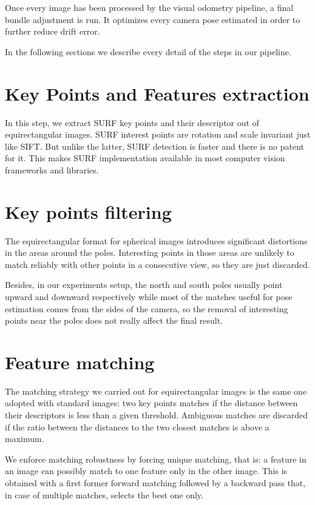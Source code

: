 Once every image has been processed by the visual odometry pipeline, a final 
bundle adjustment is run. It optimizes every camera pose estimated in order to 
further reduce drift error.

In the following sections we describe every detail of the steps in our pipeline.

\section{Key Points and Features extraction}
In this step, we extract SURF key points and their descriptor out of 
equirectangular images. SURF 
interest points are rotation and scale invariant just like SIFT. But unlike 
the latter, SURF detection is faster and there is no patent for it. 
This makes SURF implementation available in most computer vision frameworks and 
libraries.

\section{Key points filtering}
The equirectangular format for spherical images introduces significant 
distortions in the areas around the poles. Interesting points in those areas 
are unlikely to match reliably with other points in a consecutive view, 
so they are just discarded.

Besides, in our experiments setup, the north and south poles usually point 
upward and downward respectively while most of the matches useful for pose 
estimation comes from the sides of the camera, so the removal of interesting 
points near the poles does not really affect the final result.

\section{Feature matching}
The matching strategy we carried out for equirectangular images is the same one 
adopted with standard images: two key points matches if the distance between 
their descriptors is less than a given threshold. Ambiguous matches 
are discarded if the ratio between the distances to the two closest matches is 
above a maximum.

We enforce matching robustness by forcing unique matching, that is: a feature 
in an image can possibly match to one feature only in the other image.
This is obtained with a first former forward matching followed by a backward 
pass that, in case of multiple matches, selects the best one only.

